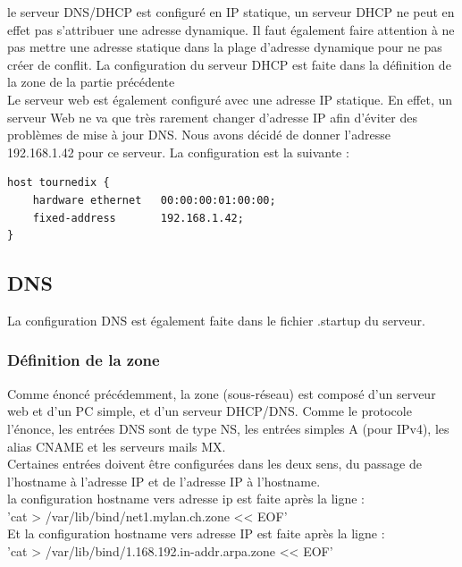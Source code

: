 \documentclass{article}
\begin{document}
le serveur DNS/DHCP est configuré en IP statique, un serveur DHCP ne peut en effet pas s'attribuer une adresse dynamique. Il faut également faire attention à ne pas mettre une adresse statique dans la plage d'adresse dynamique pour ne pas créer de conflit. La configuration du serveur DHCP est faite dans la définition de la zone de la partie précédente\\

Le serveur web est également configuré avec une adresse IP statique. En effet, un serveur Web ne va que très rarement changer d'adresse IP afin d'éviter des problèmes de mise à jour DNS. Nous avons décidé de donner l'adresse 192.168.1.42 pour ce serveur. La configuration est la suivante : \\

\begin{lstlisting}
host tournedix {
	hardware ethernet	00:00:00:01:00:00;
	fixed-address		192.168.1.42;
}
\end{lstlisting}

\subsection{DNS}

La configuration DNS est également faite dans le fichier .startup du serveur.

\subsubsection{Définition de la zone}

Comme énoncé précédemment, la zone (sous-réseau) est composé d'un serveur web et d'un PC simple, et d'un serveur DHCP/DNS. Comme le protocole l'énonce, les entrées DNS sont de type NS, les entrées simples A (pour IPv4), les alias CNAME et les serveurs mails MX. \cite{cours}\\

Certaines entrées doivent être configurées dans les deux sens, du passage de l'hostname à l'adresse IP et de l'adresse IP à l'hostname.\\

la configuration hostname vers adresse ip est faite après la ligne : \\
'cat > /var/lib/bind/net1.mylan.ch.zone << EOF' \\

Et la configuration hostname vers adresse IP est faite après la ligne :\\
 'cat > /var/lib/bind/1.168.192.in-addr.arpa.zone << EOF'
\end{document}
